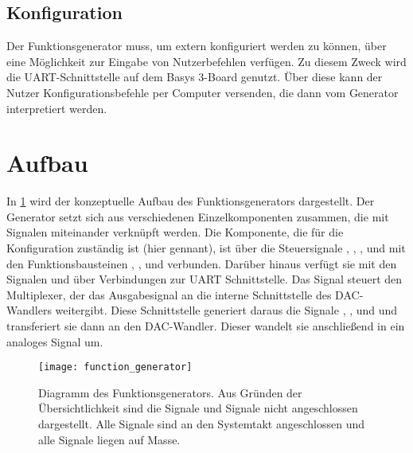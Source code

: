 \subsection{Konfiguration}
Der Funktionsgenerator muss, um extern konfiguriert werden zu können, über eine Möglichkeit zur Eingabe von Nutzerbefehlen verfügen.
Zu diesem Zweck wird die UART-Schnittstelle auf dem Basys 3-Board genutzt.
Über diese kann der Nutzer Konfigurationsbefehle per Computer versenden, die dann vom Generator interpretiert werden.

\section{Aufbau}

In \cref{Concept:FuncGenDia} wird der konzeptuelle Aufbau des Funktionsgenerators dargestellt.
Der Generator setzt sich aus verschiedenen Einzelkomponenten zusammen, die mit Signalen miteinander verknüpft werden.
Die Komponente, die für die Konfiguration zuständig ist (hier  gennant), ist über die Steuersignale , , ,  und  mit den Funktionsbausteinen , ,  und  verbunden.
Darüber hinaus verfügt sie mit den Signalen  und  über Verbindungen zur UART Schnittstelle.
Das Signal  steuert den Multiplexer, der das Ausgabesignal  an die interne Schnittstelle des DAC-Wandlers  weitergibt.
Diese Schnittstelle generiert daraus die Signale , ,  und  und transferiert sie dann an den DAC-Wandler.
Dieser wandelt sie anschließend in ein analoges Signal um.

\begin{figure}[h] \centering
  \texttt{[image: function\_generator]} %
  \caption{Diagramm des Funktionsgenerators. Aus Gründen der Übersichtlichkeit sind die  Signale und  Signale nicht angeschlossen dargestellt. Alle  Signale sind an den Systemtakt angeschlossen und alle  Signale liegen auf Masse.}  \label{Concept:FuncGenDia}
\end{figure}

